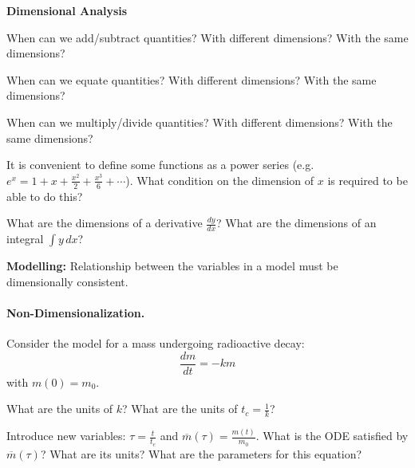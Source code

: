 \documentclass{workbook}
\begin{document}
\begin{slide}

\question 

\textbf{Dimensional Analysis}


\begin{parts}

\item When can we add/subtract quantities? With different dimensions? With the same dimensions?

\item When can we equate quantities? With different dimensions? With the same dimensions?

\item When can we multiply/divide quantities? With different dimensions? With the same dimensions?

\item It is convenient to define some functions as a power series (e.g. $e^x = 1 + x + \frac{x^2}{2} + \frac{x^3}{6}+ \cdots$). What condition on the dimension of $x$ is required to be able to do this?

\item What are the dimensions of a derivative $\frac{dy}{dx}$? What are the dimensions of an integral $\int y \, dx$?
	
\end{parts}

\begin{slidesonly}
	\bigskip
\end{slidesonly}


\textbf{Modelling:} Relationship between the variables in a model must be dimensionally consistent.

\end{slide}




\begin{slide}

\question \label{q:radioactive}

\paragraph{Non-Dimensionalization.}

Consider the model for a mass undergoing radioactive decay:
\[ \frac{dm}{dt} = -km \]
with $m(0) = m_0$.

\begin{parts}
	\item What are the units of $k$? What are the units of $t_c=\frac{1}{k}$? %

	\item Introduce new variables: $\tau = \frac{t}{t_c}$ and $\overline{m}(\tau) = \frac{m(t)}{m_0}$. What is the ODE satisfied by $\overline{m}(\tau)$? What are its units? What are the parameters for this equation?
	
\end{parts}

\end{slide}
\end{document}
